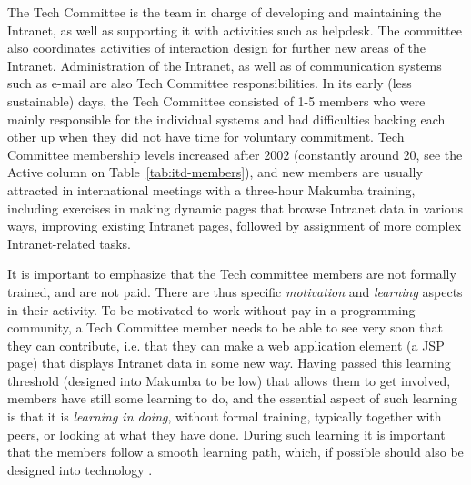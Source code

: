\documentclass{llncs}
\begin{document}
The Tech Committee is the team in charge of developing and maintaining the Intranet, as well as supporting it with activities such as helpdesk. The committee also coordinates activities of interaction design for further new areas of the Intranet. Administration of the Intranet, as well as of communication systems such as e-mail are also Tech Committee responsibilities. In its early (less sustainable) days, the Tech Committee consisted of 1-5 members who were mainly responsible for the individual systems and had difficulties backing each other up when they did not have time for voluntary commitment. Tech Committee membership levels increased after 2002 (constantly around 20, see the Active column on Table~\ref{tab:itd-members}), and new members are usually attracted in international meetings with a three-hour Makumba training, including exercises in making dynamic pages that browse Intranet data in various ways, improving existing Intranet pages, followed by assignment of more complex Intranet-related tasks.



It is important to emphasize that the Tech committee members are not formally trained, and are not paid. There are thus specific \textit{motivation} and \textit{learning} aspects in their activity. To be motivated to work without pay in a programming community, a Tech Committee member needs to be able to see very soon that they can contribute, i.e. that they can make a web application element (a JSP page) that displays Intranet data in some new way. Having passed this learning threshold (designed into Makumba to be low) that allows them to get involved, members have still some learning to do, and the essential aspect of such learning is that it is \textit {learning in doing}, without formal training, typically together with peers, or looking at what they have done. During such learning it is important that the members follow a smooth learning path, which, if possible should also be designed into technology \cite{bogdan_mayer09}.
\end{document}
